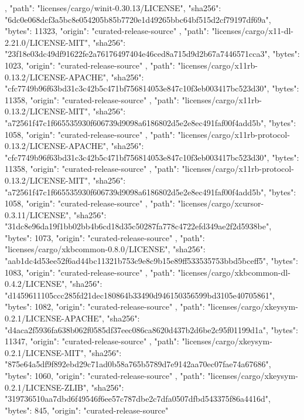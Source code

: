 {{    },
    {
      "path": "licenses/cargo/winit-0.30.13/LICENSE",
      "sha256": "6dc0e068dcf3a5bc8e054205b85b7720e1d49265bbc64bf515d2cf79197df69a",
      "bytes": 11323,
      "origin": "curated-release-source"
    },
    {
      "path": "licenses/cargo/x11-dl-2.21.0/LICENSE-MIT",
      "sha256": "23f18e03dc49df91622fe2a76176497404e46ced8a715d9d2b67a7446571cca3",
      "bytes": 1023,
      "origin": "curated-release-source"
    },
    {
      "path": "licenses/cargo/x11rb-0.13.2/LICENSE-APACHE",
      "sha256": "cfc7749b96f63bd31c3c42b5c471bf756814053e847c10f3eb003417bc523d30",
      "bytes": 11358,
      "origin": "curated-release-source"
    },
    {
      "path": "licenses/cargo/x11rb-0.13.2/LICENSE-MIT",
      "sha256": "a72561f47c1f665535930f606739d9098a6186802d5e2e8ec491faf00f4add5b",
      "bytes": 1058,
      "origin": "curated-release-source"
    },
    {
      "path": "licenses/cargo/x11rb-protocol-0.13.2/LICENSE-APACHE",
      "sha256": "cfc7749b96f63bd31c3c42b5c471bf756814053e847c10f3eb003417bc523d30",
      "bytes": 11358,
      "origin": "curated-release-source"
    },
    {
      "path": "licenses/cargo/x11rb-protocol-0.13.2/LICENSE-MIT",
      "sha256": "a72561f47c1f665535930f606739d9098a6186802d5e2e8ec491faf00f4add5b",
      "bytes": 1058,
      "origin": "curated-release-source"
    },
    {
      "path": "licenses/cargo/xcursor-0.3.11/LICENSE",
      "sha256": "31dc8e96da19f1bb02bb4b6cd18d35c50287fa778c4722efd349ae2f2d5938be",
      "bytes": 1073,
      "origin": "curated-release-source"
    },
    {
      "path": "licenses/cargo/xkbcommon-0.8.0/LICENSE",
      "sha256": "aab1dc4d53ee52f6ad44bc11321b753c9e8c9b15e89ff533535753bbd5bceff5",
      "bytes": 1083,
      "origin": "curated-release-source"
    },
    {
      "path": "licenses/cargo/xkbcommon-dl-0.4.2/LICENSE",
      "sha256": "d1459611105ccc285fd21dec180864b33490d946150356599bd3105e40705861",
      "bytes": 1082,
      "origin": "curated-release-source"
    },
    {
      "path": "licenses/cargo/xkeysym-0.2.1/LICENSE-APACHE",
      "sha256": "d4aca2f5936fa638b062f0585df37eec086ca8620d437b2d6be2c95f01199d1a",
      "bytes": 11347,
      "origin": "curated-release-source"
    },
    {
      "path": "licenses/cargo/xkeysym-0.2.1/LICENSE-MIT",
      "sha256": "875e64a5df9f892ebd29c71ad0b58a765b5789d7e9142aa70ec07fae74a67686",
      "bytes": 1060,
      "origin": "curated-release-source"
    },
    {
      "path": "licenses/cargo/xkeysym-0.2.1/LICENSE-ZLIB",
      "sha256": "319736510aa7dbd6f49546f6ee57c787dbe2c7dfa0507dfbd543375f86a4416d",
      "bytes": 845,
      "origin": "curated-release-source"
}}
